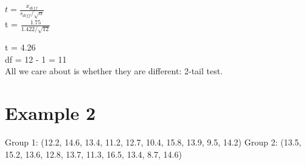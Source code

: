 \documentclass[12pt]{article}
\begin{document}
$t = \frac{x_{diff}}{s_{diff}/\sqrt{n}}$\\

t = $\frac{1.75}{1.422/ \sqrt{12}}$

t = 4.26 \\

df = 12 - 1 = 11\\

All we care about is whether they are different: 2-tail test.\\

\newpage

\section{Example 2}

Group 1: (12.2, 14.6, 13.4, 11.2, 12.7, 10.4, 15.8, 13.9, 9.5, 14.2)
Group 2: (13.5, 15.2, 13.6, 12.8, 13.7, 11.3, 16.5, 13.4, 8.7, 14.6)
\end{document}
